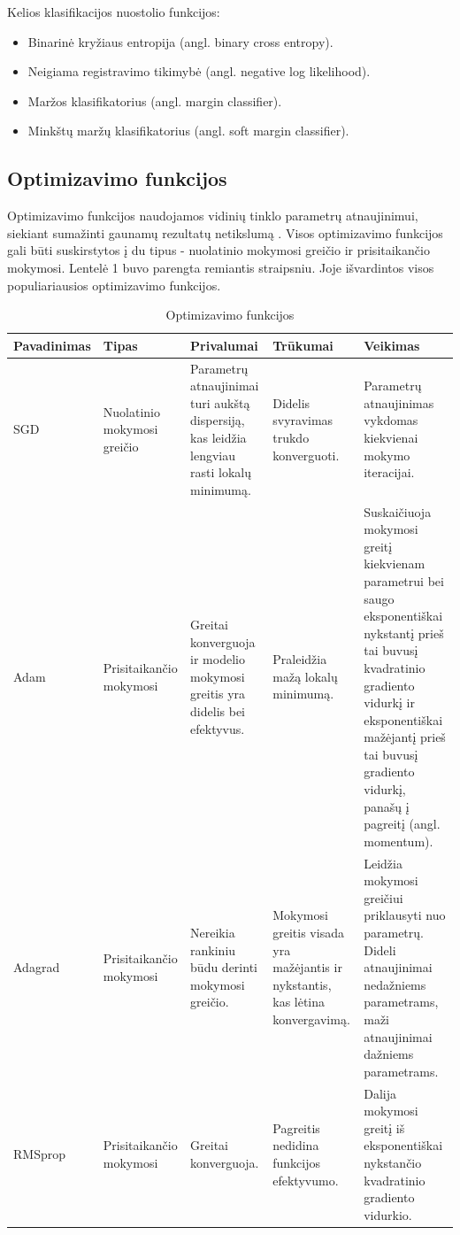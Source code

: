 \documentclass{VUMIFPSbakalaurinis}
\begin{document}
Kelios klasifikacijos nuostolio funkcijos:
\begin{itemize}
\item Binarinė kryžiaus entropija (angl. binary cross entropy).
\item Neigiama registravimo tikimybė (angl. negative log likelihood).
\item Maržos klasifikatorius (angl. margin classifier).
\item Minkštų maržų klasifikatorius (angl. soft margin classifier).
\end{itemize}

\subsection{Optimizavimo funkcijos}
Optimizavimo funkcijos naudojamos vidinių tinklo parametrų atnaujinimui, siekiant sumažinti gaunamų rezultatų netikslumą \cite{Niknafs2016NeuralNO}. 
Visos optimizavimo funkcijos gali būti suskirstytos į du tipus - nuolatinio mokymosi greičio ir prisitaikančio mokymosi. 
Lentelė 1 buvo parengta remiantis \cite{DBLP:journals/corr/Ruder16} straipsniu. Joje išvardintos visos populiariausios optimizavimo funkcijos.

\begin{longtable}[h!]{ | p{2cm} | p{2.2cm} | p{2.5cm} | p{2.5cm} | p{4.5cm} | } 
\caption{Optimizavimo funkcijos} \\ \hline
Pavadinimas & Tipas & Privalumai & Trūkumai & Veikimas \\ \hline
\endhead
SGD & Nuolatinio mokymosi greičio & Parametrų atnaujinimai turi aukštą dispersiją, kas leidžia lengviau rasti lokalų minimumą. & Didelis svyravimas trukdo konverguoti. & Parametrų atnaujinimas vykdomas kiekvienai mokymo iteracijai. \\ \hline
Adam & Prisitaikančio mokymosi & Greitai konverguoja ir modelio mokymosi greitis yra didelis bei efektyvus. & Praleidžia mažą lokalų minimumą. & Suskaičiuoja mokymosi greitį kiekvienam parametrui bei saugo eksponentiškai nykstantį prieš tai buvusį kvadratinio gradiento vidurkį ir eksponentiškai mažėjantį prieš tai buvusį gradiento vidurkį, panašų į pagreitį (angl. momentum). \\ \hline
Adagrad & Prisitaikančio mokymosi & Nereikia rankiniu būdu derinti mokymosi greičio. & Mokymosi greitis visada yra mažėjantis ir nykstantis, kas lėtina konvergavimą. & Leidžia mokymosi greičiui priklausyti nuo parametrų. Dideli atnaujinimai nedažniems parametrams, maži atnaujinimai dažniems parametrams. \\ \hline
RMSprop & Prisitaikančio mokymosi & Greitai konverguoja. & Pagreitis nedidina funkcijos efektyvumo. & Dalija mokymosi greitį iš eksponentiškai nykstančio kvadratinio gradiento vidurkio. \\ \hline
\end{longtable}
\end{document}
